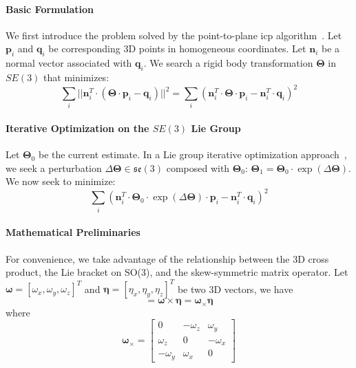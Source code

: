 
\paragraph{Basic Formulation}
We first introduce the problem solved by the point-to-plane \gls{icp} algorithm~\cite{Rusinkiewicz:IC3DIM:2001}.
Let $\mathbf{p}_i$ and $\mathbf{q}_i$ be corresponding 3D points in homogeneous coordinates. Let $\mathbf{n}_i$ be a normal vector associated with $\mathbf{q}_i$. We search a rigid body transformation $\mathbf{\Theta}$ in $SE(3)$ that minimizes:
\begin{equation}
\sum_i ||\mathbf{n}_i^T \cdot (\mathbf{\Theta} \cdot \mathbf{p}_i - \mathbf{q}_i)||^2 = \sum_i (\mathbf{n}_i^T \cdot \mathbf{\Theta} \cdot \mathbf{p}_i - \mathbf{n}_i^T \cdot \mathbf{q}_i)^2
\end{equation}

\paragraph{Iterative Optimization on the $SE(3)$ Lie Group}
Let $\mathbf{\Theta}_0$ be the current estimate. In a Lie group iterative optimization approach~\cite{Mahony:JGO:2002,Vercauteren:IPMI:2007}, we seek a perturbation $\Delta\mathbf{\Theta} \in \mathfrak{se}(3)$ composed with
$\mathbf{\Theta}_0$: $\mathbf{\Theta}_1 = \mathbf{\Theta}_0 \cdot \exp(\Delta\mathbf{\Theta})$. We now seek to minimize:
\begin{equation}
\sum_i (\mathbf{n}_i^T \cdot \mathbf{\Theta}_0 \cdot \exp(\Delta\mathbf{\Theta}) \cdot \mathbf{p}_i - \mathbf{n}_i^T \cdot \mathbf{q}_i)^2
\end{equation}

\paragraph{Mathematical Preliminaries}
For convenience, we take advantage of the relationship between the 3D cross product, the Lie bracket on SO(3), and the skew-symmetric matrix operator.
Let $\boldsymbol{\omega} = [\omega_x, \omega_y, \omega_z]^T$ and $\boldsymbol{\eta} = [\eta_x, \eta_y, \eta_z]^T$ be two 3D vectors, we have
\begin{equation}
[\boldsymbol{\omega}, \boldsymbol{\eta}] = \boldsymbol{\omega} \times \boldsymbol{\eta} = \boldsymbol{\omega}_\times \boldsymbol{\eta}
\end{equation}
where
\begin{equation}
\boldsymbol{\omega}_\times =
\begin{bmatrix}
0         & -\omega_z & \omega_y \\
\omega_z  & 0         & -\omega_x \\
-\omega_y & \omega_x  & 0
\end{bmatrix}
\end{equation}

